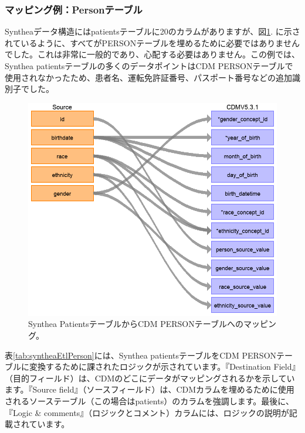 \documentclass[
  11pt]{book}
\theoremstyle{definition}
\theoremstyle{definition}
\theoremstyle{definition}
\theoremstyle{definition}
\theoremstyle{remark}
\begin{document}
\subsubsection*{マッピング例：Personテーブル}\label{ux30deux30c3ux30d4ux30f3ux30b0ux4f8bpersonux30c6ux30fcux30d6ux30eb}

Syntheaデータ構造にはpatientsテーブルに20のカラムがありますが、図\ref{fig:syntheaPerson}. に示されているように、すべてがPERSONテーブルを埋めるために必要ではありませんでした。これは非常に一般的であり、心配する必要はありません。この例では、Synthea patientsテーブルの多くのデータポイントはCDM PERSONテーブルで使用されなかったため、患者名、運転免許証番号、パスポート番号などの追加識別子でした。

\begin{figure}

{\centering \includegraphics[width=1\linewidth]{images/ExtractTransformLoad/syntheaPersonTable} 

}

\caption{Synthea PatientsテーブルからCDM PERSONテーブルへのマッピング。}\label{fig:syntheaPerson}
\end{figure}

表\ref{tab:syntheaEtlPerson}には、Synthea patientsテーブルをCDM PERSONテーブルに変換するために課されたロジックが示されています。『Destination Field』（目的フィールド）は、CDMのどこにデータがマッピングされるかを示しています。『Source field』（ソースフィールド）は、CDMカラムを埋めるために使用されるソーステーブル（この場合はpatients）のカラムを強調します。最後に、『Logic \& comments』（ロジックとコメント）カラムには、ロジックの説明が記載されています。
\end{document}
